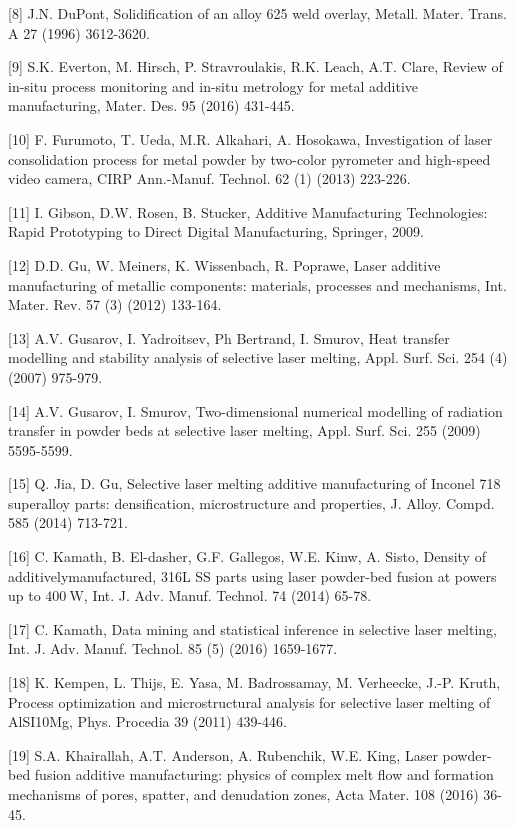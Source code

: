 \documentclass[10pt]{article}
\begin{document}
[8] J.N. DuPont, Solidification of an alloy 625 weld overlay, Metall. Mater. Trans. A 27 (1996) 3612-3620.

[9] S.K. Everton, M. Hirsch, P. Stravroulakis, R.K. Leach, A.T. Clare, Review of in-situ process monitoring and in-situ metrology for metal additive manufacturing, Mater. Des. 95 (2016) 431-445.

[10] F. Furumoto, T. Ueda, M.R. Alkahari, A. Hosokawa, Investigation of laser consolidation process for metal powder by two-color pyrometer and high-speed video camera, CIRP Ann.-Manuf. Technol. 62 (1) (2013) 223-226.

[11] I. Gibson, D.W. Rosen, B. Stucker, Additive Manufacturing Technologies: Rapid Prototyping to Direct Digital Manufacturing, Springer, 2009.

[12] D.D. Gu, W. Meiners, K. Wissenbach, R. Poprawe, Laser additive manufacturing of metallic components: materials, processes and mechanisms, Int. Mater. Rev. 57 (3) (2012) 133-164.

[13] A.V. Gusarov, I. Yadroitsev, Ph Bertrand, I. Smurov, Heat transfer modelling and stability analysis of selective laser melting, Appl. Surf. Sci. 254 (4) (2007) 975-979.

[14] A.V. Gusarov, I. Smurov, Two-dimensional numerical modelling of radiation transfer in powder beds at selective laser melting, Appl. Surf. Sci. 255 (2009) 5595-5599.

[15] Q. Jia, D. Gu, Selective laser melting additive manufacturing of Inconel 718 superalloy parts: densification, microstructure and properties, J. Alloy. Compd. 585 (2014) 713-721.

[16] C. Kamath, B. El-dasher, G.F. Gallegos, W.E. Kinw, A. Sisto, Density of additivelymanufactured, 316L SS parts using laser powder-bed fusion at powers up to $400 \mathrm{~W}$, Int. J. Adv. Manuf. Technol. 74 (2014) 65-78.

[17] C. Kamath, Data mining and statistical inference in selective laser melting, Int. J. Adv. Manuf. Technol. 85 (5) (2016) 1659-1677.

[18] K. Kempen, L. Thijs, E. Yasa, M. Badrossamay, M. Verheecke, J.-P. Kruth, Process optimization and microstructural analysis for selective laser melting of AlSI10Mg, Phys. Procedia 39 (2011) 439-446.

[19] S.A. Khairallah, A.T. Anderson, A. Rubenchik, W.E. King, Laser powder-bed fusion additive manufacturing: physics of complex melt flow and formation mechanisms of pores, spatter, and denudation zones, Acta Mater. 108 (2016) 36-45.
\end{document}
